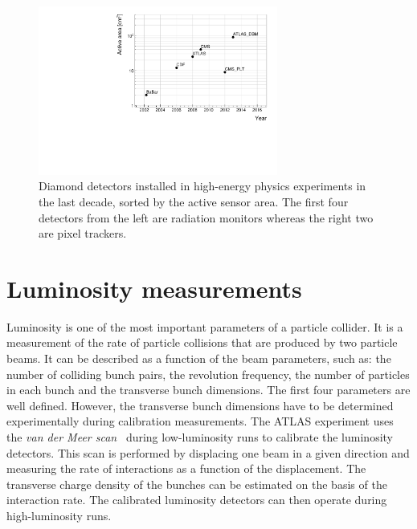 \begin{figure}[!t]
\centering
\includegraphics[width=0.7\textwidth]{../scripts/04_charge_monitoring/plots/detArea}
\caption{Diamond detectors installed in high-energy physics experiments in the last decade, sorted by the active sensor area. The first four detectors from the left are radiation monitors whereas the right two are pixel trackers.}
\label{fig:areavsyear}
\end{figure}

\section{Luminosity measurements}
\label{sec:lumi}
Luminosity is one of the most important parameters of a particle collider. It is a measurement of the rate of particle collisions that are produced by two particle beams. It can be described as a function of the beam parameters, such as: the number of colliding bunch pairs, the revolution frequency, the number of particles in each bunch and the transverse bunch dimensions. The first four parameters are well defined. However, the transverse bunch dimensions have to be determined experimentally during calibration measurements. The ATLAS experiment uses the \emph{van der Meer scan}~\cite{ATLAS-CONF-2010-102} during low-luminosity runs to calibrate the luminosity detectors. This scan is performed by displacing one beam in a given direction and measuring the rate of interactions as a function of the displacement. The transverse charge density of the bunches can be estimated on the basis of the interaction rate. The calibrated luminosity detectors can then operate during high-luminosity runs.

